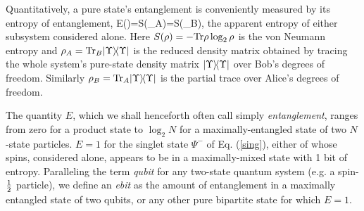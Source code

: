 Quantitatively, a pure state's entanglement is conveniently measured
by its entropy of entanglement,
\beq
E(\Upsilon)=S(\rho_A)=S(\rho_B),\label{tangy}
\eeq
the apparent entropy of either subsystem considered
alone.  Here $S(\rho)=-{\rm Tr}\rho\log_2\rho$ is the von Neumann entropy
and $\rho_A={\rm Tr}_B| \Upsilon \rangle\! \langle \Upsilon |$ is the reduced density matrix obtained
by tracing the whole system's pure-state density matrix
$| \Upsilon \rangle\! \langle \Upsilon |$ over Bob's degrees of freedom.  Similarly
$\rho_B={\rm Tr}_A| \Upsilon \rangle\! \langle \Upsilon |$ is the partial trace over Alice's
degrees of freedom.
 
The quantity $E$, which we shall henceforth often call simply {\em
entanglement}, ranges from zero for a product state to $\log_2 N$ for
a maximally-entangled state of two $N$-state particles.  $E=1$ for the
singlet state $\Psi^-$ of Eq. (\ref{sing}), either of whose spins,
considered alone, appears to be in a maximally-mixed state with 1 bit
of entropy.  Paralleling the term {\em qubit\/} for any
two-state quantum system (e.g. a spin-$\mbox{$\textstyle \frac{1}{2}$}$ particle),
we define an {\em ebit\/} as the amount of entanglement in a maximally
entangled state of two qubits, or any other pure bipartite state
for which $E=1$.
 
